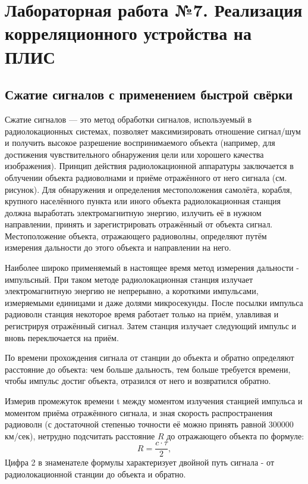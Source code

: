 \chapter{Лабораторная работа №7. Реализация корреляционного устройства на ПЛИС}

\section{Сжатие сигналов с применением быстрой свёрки}

Сжатие сигналов — это метод обработки сигналов, используемый в радиолокационных системах,
позволяет максимизировать отношение сигнал/шум и получить высокое разрешение воспринимаемого объекта (например, для достижения чувствительного обнаружения цели или хорошего качества изображения). Принцип действия радиолокационной аппаратуры заключается в облучении объекта радиоволнами и приёме отражённого от него сигнала (см. рисунок). Для обнаружения и определения местоположения самолёта, корабля, крупного населённого пункта или иного объекта радиолокационная станция должна выработать электромагнитную энергию, излучить её в нужном направлении, принять и зарегистрировать отражённый от объекта сигнал. Местоположение объекта, отражающего радиоволны, определяют путём измерения дальности до этого объекта и направлении на него.

Наиболее широко применяемый в настоящее время метод измерения дальности - импульсный. При таком методе радиолокационная станция излучает электромагнитную энергию не непрерывно, а короткими импульсами, измеряемыми единицами и даже долями микросекунды. После посылки импульса радиоволн станция некоторое время работает только на приём, улавливая и регистрируя отражённый сигнал. Затем станция излучает следующий импульс и вновь переключается на приём.

По времени прохождения сигнала от станции до объекта и обратно определяют расстояние до объекта: чем больше дальность, тем больше требуется времени, чтобы импульс достиг объекта, отразился от него и возвратился обратно.

Измерив промежуток времени t между моментом излучения станцией импульса и моментом приёма отражённого сигнала, и зная скорость распространения радиоволн (с достаточной степенью точности её можно принять равной 300000 км/сек), нетрудно подсчитать расстояние $R$ до отражающего объекта по формуле:
\begin{equation}
R = \frac{c \cdot \tau}{2},
\end{equation}
Цифра 2 в знаменателе формулы характеризует двойной путь сигнала - от радиолокационной станции до объекта и обратно.

